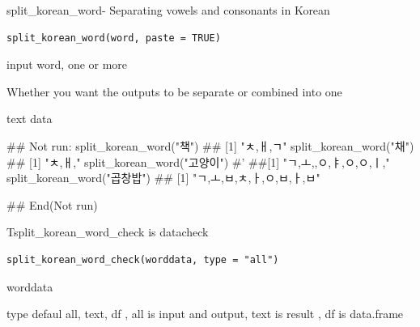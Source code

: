 \documentclass[a4paper]{book}
\begin{document}
%
\begin{Description}
split\_korean\_word- Separating vowels and consonants in Korean
\end{Description}
%
\begin{Usage}
\begin{verbatim}
split_korean_word(word, paste = TRUE)
\end{verbatim}
\end{Usage}
%
\begin{Arguments}
\begin{ldescription}
\item[\code{word}] input word, one or more

\item[\code{paste}] Whether you want the outputs to be separate or combined into one
\end{ldescription}
\end{Arguments}
%
\begin{Value}
text data
\end{Value}
%
\begin{Examples}
\begin{ExampleCode}
## Not run: 
split_korean_word("책")
## [1] "ㅊ,ㅐ,ㄱ"
split_korean_word("채")
## [1] "ㅊ,ㅐ,"
split_korean_word("고양이")
#' ##[1] "ㄱ,ㅗ,,ㅇ,ㅑ,ㅇ,ㅇ,ㅣ,"
split_korean_word("곱창밥")
## [1] "ㄱ,ㅗ,ㅂ,ㅊ,ㅏ,ㅇ,ㅂ,ㅏ,ㅂ"

## End(Not run)

\end{ExampleCode}
\end{Examples}
%
\begin{Description}
Tsplit\_korean\_word\_check is datacheck
\end{Description}
%
\begin{Usage}
\begin{verbatim}
split_korean_word_check(worddata, type = "all")
\end{verbatim}
\end{Usage}
%
\begin{Arguments}
\begin{ldescription}
\item[\code{worddata}] worddata

\item[\code{type}] type defaul all, text, df , all is input and output, text is result , df is data.frame
\end{ldescription}
\end{Arguments}
\end{document}
